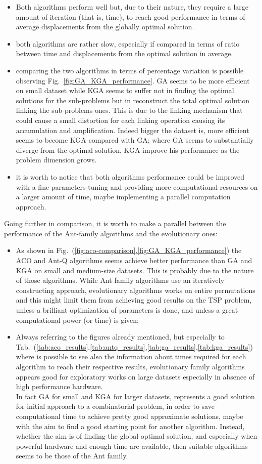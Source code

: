 \documentclass[10pt]{article}
\begin{document}
\begin{itemize}
\item Both algorithms perform well but, due to their nature, they require a large amount of iteration (that is, time), to reach good performance in terms of average displacements from the globally optimal solution.
\item both algorithms are rather slow, especially if compared in terms of ratio between time and displacements from the optimal solution in average.
\item comparing the two algorithms in terms of percentage variation is possible observing Fig.~\ref{fig:GA_KGA_performance}. GA seems to be more efficient on small dataset while KGA seems to suffer not in finding the optimal solutions for the sub-problems but in reconstruct the total optimal solution linking the sub-problems ones. This is due to the linking mechanism that could cause a small distortion for each linking operation causing its accumulation and amplification. Indeed bigger the dataset is, more efficient seems to become KGA compared with GA; where GA seems to substantially diverge from the optimal solution, KGA improve his performance as the problem dimension grows.
\item it is worth to notice that both algorithms performance could be improved with a fine parameters tuning and providing more computational resources on a larger amount of time, maybe implementing a parallel computation approach. 
\end{itemize}
Going further in comparison, it is worth to make a parallel between the performance of the Ant-family algorithms and the evolutionary ones:
\begin{itemize}
\item As shown in Fig.~(\ref{fig:aco-comparison},\ref{fig:GA_KGA_performance}) the ACO and Ant-Q algorithms seems achieve better performance than GA and KGA on small and medium-size datasets. 
This is probably due to the nature of those algorithms.
While Ant family algorithms use an iteratively constructing approach, evolutionary algorithms works on entire permutations and this might limit them from achieving good results on the TSP problem, unless a brilliant optimization of parameters is done, and unless a great computational power (or time) is given;
\item Always referring to the figures already mentioned, but especially to Tab.~(\ref{tab:aco_results},\ref{tab:antq_results},\ref{tab:ga_results},\ref{tab:kga_results}) where is possible to see also the information about times required for each algorithm to reach their respective results, evolutionary family algorithms appears good for exploratory works on large datasets especially in absence of high performance hardware.
\\In fact GA for small and KGA for larger datasets, represents a good solution for initial approach to a combinatorial problem, in order to save computational time to achieve pretty good approximate solutions, maybe with the aim to find a good starting point for another algorithm.
Instead, whether the aim is of finding the global optimal solution, and especially when powerful hardware and enough time are available, then suitable algorithms seems to be those of the Ant family.
\end{itemize}
\end{document}
